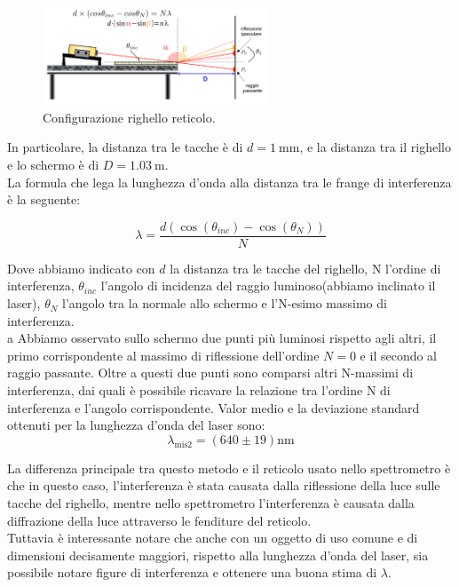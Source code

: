 \documentclass[letterpaper,12pt]{article}
\begin{document}
\begin{figure}[h!]
    \centering
    \includegraphics[width=0.6\textwidth]{Righello_config.png}
    \caption{Configurazione righello reticolo.}
    \label{fig:Righello_config}
\end{figure}

In particolare, la distanza tra le tacche è di $d = \SI{1}{\milli\meter}$, e la distanza tra il righello e lo 
schermo è di $D = \SI{1.03}{\meter}$.\\
La formula che lega la lunghezza d'onda alla distanza tra le frange di interferenza è la seguente:

\begin{equation}
    \lambda = \frac{d (\cos(\theta_{inc})-\cos(\theta_N))}{N}
    \label{eq:lunghezza_onda}
\end{equation}

Dove abbiamo indicato con $d$ la distanza tra le tacche del righello, N l'ordine di interferenza, $\theta_{inc}$ 
l'angolo di incidenza del raggio luminoso(abbiamo inclinato il laser), $\theta_N$ l'angolo tra la normale allo schermo e l'N-esimo massimo di 
interferenza.\\
a
Abbiamo osservato sullo schermo due punti più luminosi rispetto agli altri, il primo corrispondente al massimo di riflessione dell'ordine $N = 0$ e il secondo al raggio passante.
Oltre a questi due punti sono comparsi altri N-massimi di interferenza, dai quali è possibile ricavare la relazione tra l'ordine N di interferenza e l'angolo corrispondente.
Valor medio e la deviazione standard ottenuti per la lunghezza d'onda del laser sono:
$$ \lambda_\text{mis2}= (640 \pm 19) \text{nm}$$

La differenza principale tra questo metodo e il reticolo usato nello spettrometro è che in questo caso, l'interferenza è stata causata
dalla riflessione della luce sulle tacche del righello, mentre nello spettrometro l'interferenza è causata dalla diffrazione della luce
attraverso le fenditure del reticolo.\\
Tuttavia è interessante notare che anche con un oggetto di uso comune e di dimensioni decisamente maggiori, rispetto alla lunghezza d'onda del laser, sia possibile 
notare figure di interferenza e ottenere una buona stima di $\lambda$.
\end{document}
